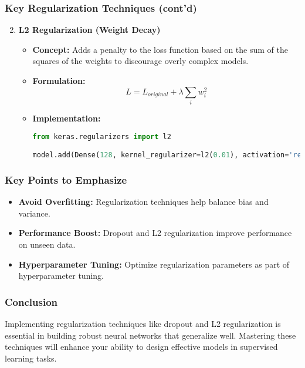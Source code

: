 \documentclass[aspectratio=169]{beamer}
\begin{document}
\begin{frame}
  \frametitle{Key Regularization Techniques (cont'd)}
  \begin{enumerate}
    \setcounter{enumi}{1} %
    \item \textbf{L2 Regularization (Weight Decay)}
      \begin{itemize}
        \item \textbf{Concept:} Adds a penalty to the loss function based on the sum of the squares of the weights to discourage overly complex models.
        \item \textbf{Formulation:}
          \begin{equation}
            L = L_{original} + \lambda \sum_{i} w_i^2
          \end{equation}
        \item \textbf{Implementation:}
        \begin{lstlisting}[language=python]
from keras.regularizers import l2

model.add(Dense(128, kernel_regularizer=l2(0.01), activation='relu'))
        \end{lstlisting}
      \end{itemize}
  \end{enumerate}
\end{frame}

\begin{frame}
  \frametitle{Key Points to Emphasize}
  \begin{itemize}
    \item \textbf{Avoid Overfitting:} Regularization techniques help balance bias and variance.
    \item \textbf{Performance Boost:} Dropout and L2 regularization improve performance on unseen data.
    \item \textbf{Hyperparameter Tuning:} Optimize regularization parameters as part of hyperparameter tuning.
  \end{itemize}
\end{frame}

\begin{frame}
  \frametitle{Conclusion}
  Implementing regularization techniques like dropout and L2 regularization is essential in building robust neural networks that generalize well. 
  Mastering these techniques will enhance your ability to design effective models in supervised learning tasks.
\end{frame}
\end{document}
